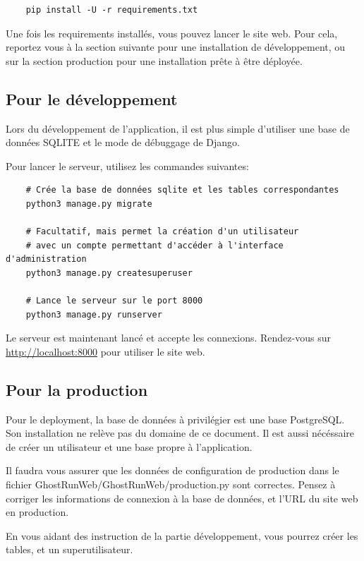 \begin{verbatim}
    pip install -U -r requirements.txt
\end{verbatim}

Une fois les requirements installés, vous pouvez lancer le site web. Pour cela, reportez vous à la section suivante pour une installation de développement, ou sur la section production pour une installation prête à être déployée.

\subsection{Pour le développement}

Lors du développement de l'application, il est plus simple d'utiliser une base de données SQLITE et le mode de débuggage de Django.

Pour lancer le serveur, utilisez les commandes suivantes:
\begin{verbatim}
    # Crée la base de données sqlite et les tables correspondantes
    python3 manage.py migrate

    # Facultatif, mais permet la création d'un utilisateur
    # avec un compte permettant d'accéder à l'interface d'administration
    python3 manage.py createsuperuser

    # Lance le serveur sur le port 8000
    python3 manage.py runserver
\end{verbatim}

Le serveur est maintenant lancé et accepte les connexions. Rendez-vous sur \url{http://localhost:8000} pour utiliser le site web.

\subsection{Pour la production}

Pour le deployment, la base de données à privilégier est une base PostgreSQL. Son installation ne relève pas du domaine de ce document. Il est aussi nécéssaire de créer un utilisateur et une base propre à l'application.

Il faudra vous assurer que les données de configuration de production dans le fichier GhostRunWeb/GhostRunWeb/production.py sont correctes. Pensez à corriger les informations de connexion à la base de données, et l'URL du site web en production.

En vous aidant des instruction de la partie développement, vous pourrez créer les tables, et un superutilisateur.

